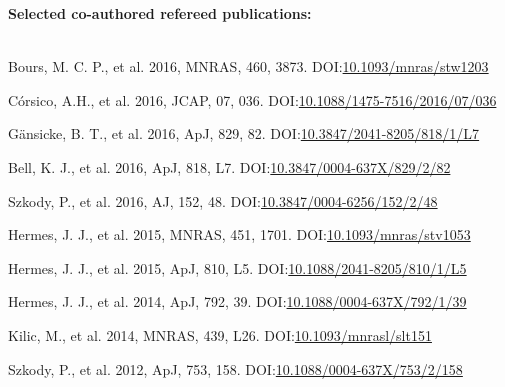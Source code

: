 \documentclass[print]{cv-style}
\begin{document}
{\bf Selected co-authored refereed publications:}\\
~\vspace{-2mm}\\
\begin{entrylist}

  {\small Bours, M. C. P., et al. 2016, MNRAS, 460, 3873. \textsc{DOI:}\href{http://dx.doi.org/10.1093/mnras/stw1203}{10.1093/mnras/stw1203}}

  {\small Córsico, A.H., et al. 2016, JCAP, 07, 036. \textsc{DOI:}\href{http://dx.doi.org/10.1088/1475-7516/2016/07/036}{10.1088/1475-7516/2016/07/036}}

  {\small Gänsicke, B. T., et al. 2016, ApJ, 829, 82. \textsc{DOI:}\href{http://dx.doi.org/10.3847/2041-8205/818/1/L7}{10.3847/2041-8205/818/1/L7}}

  {\small Bell, K. J., et al. 2016, ApJ, 818, L7. \textsc{DOI:}\href{http://dx.doi.org/10.3847/0004-637X/829/2/82}{10.3847/0004-637X/829/2/82}}

  {\small Szkody, P., et al. 2016, AJ, 152, 48. \textsc{DOI:}\href{http://dx.doi.org/10.3847/0004-6256/152/2/48}{10.3847/0004-6256/152/2/48}}

  {\small Hermes, J. J., et al. 2015, MNRAS, 451, 1701. \textsc{DOI:}\href{http://dx.doi.org/10.1093/mnras/stv1053}{10.1093/mnras/stv1053}}

  {\small Hermes, J. J., et al. 2015, ApJ, 810, L5. \textsc{DOI:}\href{http://dx.doi.org/10.1088/2041-8205/810/1/L5}{10.1088/2041-8205/810/1/L5}}

  {\small Hermes, J. J., et al. 2014, ApJ, 792, 39. \textsc{DOI:}\href{http://dx.doi.org/10.1088/0004-637X/792/1/39}{10.1088/0004-637X/792/1/39}}

  {\small Kilic, M., et al. 2014, MNRAS, 439, L26. \textsc{DOI:}\href{http://dx.doi.org/10.1093/mnrasl/slt151}{10.1093/mnrasl/slt151}}

  {\small Szkody, P., et al. 2012, ApJ, 753, 158. \textsc{DOI:}\href{http://dx.doi.org/10.1088/0004-637X/753/2/158}{10.1088/0004-637X/753/2/158}}
\end{entrylist}
\end{document}
